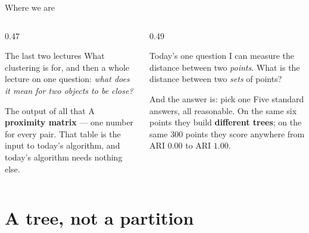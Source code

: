 \documentclass[aspectratio=169]{beamer}
\begin{document}
\begin{frame}[shrink=5]{Where we are}
  \begin{columns}[T]
    \begin{column}{0.47\textwidth}
      \begin{block}{The last two lectures}
        What clustering is for, and then a whole lecture on one question:
        \emph{what does it mean for two objects to be close?}
      \end{block}
      \begin{block}{The output of all that}
        A \textbf{proximity matrix} --- one number for every pair. That table
        is the input to today's algorithm, and today's algorithm needs
        nothing else.
      \end{block}
    \end{column}
    \begin{column}{0.49\textwidth}
      \begin{exampleblock}{Today's one question}
        I can measure the distance between two \emph{points}. What is the
        distance between two \emph{sets} of points?
      \end{exampleblock}
      \begin{alertblock}{And the answer is: pick one}
        Five standard answers, all reasonable. On the same six points they
        build \textbf{different trees}; on the same $300$ points they score
        anywhere from ARI $0.00$ to ARI $1.00$.
      \end{alertblock}
    \end{column}
  \end{columns}
\end{frame}

\section[A tree]{A tree, not a partition}
\label{sec:tree}
\end{document}
